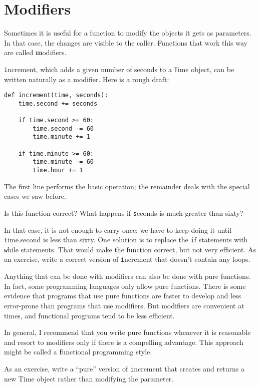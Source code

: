 \documentclass[
DIV=11,
fontsize=13,
twoside,
headinclude=false,
titlepage=firstiscover,
abstract=true,
headsepline=true,
footsepline=true,
chapterprefix=true, %
headings=big,
bibliography=totoc,%
captions=tableheading
]{scrbook}
\theoremstyle{definition}
\begin{document}
\section{Modifiers}
\label{increment}

Sometimes it is useful for a function to modify the objects it gets as
parameters.  In that case, the changes are visible to the caller.
Functions that work this way are called {\textbf modifiers}.

{\texttt increment}, which adds a given number of seconds to a {\texttt Time}
object, can be written naturally as a
modifier.  Here is a rough draft:

\begin{lstlisting}
def increment(time, seconds):
    time.second += seconds

    if time.second >= 60:
        time.second -= 60
        time.minute += 1

    if time.minute >= 60:
        time.minute -= 60
        time.hour += 1
\end{lstlisting}
%
The first line performs the basic operation; the remainder deals
with the special cases we saw before.

Is this function correct?  What happens if {\texttt seconds}
is much greater than sixty?  

In that case, it is not enough to carry once; we have to keep doing it
until {\texttt time.second} is less than sixty.  One solution is to
replace the {\texttt if} statements with {\texttt while} statements.  That
would make the function correct, but not very efficient.  As an
exercise, write a correct version of {\texttt increment} that doesn't
contain any loops.

Anything that can be done with modifiers can also be done with pure
functions.  In fact, some programming languages only allow pure
functions.  There is some evidence that programs that use pure
functions are faster to develop and less error-prone than programs
that use modifiers.  But modifiers are convenient at times,
and functional programs tend to be less efficient.

In general, I recommend that you write pure functions whenever it is
reasonable and resort to modifiers only if there is a compelling
advantage.  This approach might be called a {\textbf functional
programming style}.

As an exercise, write a ``pure'' version of {\texttt increment} that
creates and returns a new Time object rather than modifying the
parameter.
\end{document}
